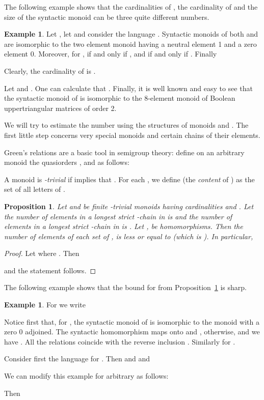 \documentclass[copyright]{eptcs}
\newcounter{theorem}
\newtheorem{proposition}[theorem]{Proposition}
\theoremstyle{definition}
\newtheorem{example}[theorem]{Example}
\begin{document}
The following example shows that the cardinalities of ,
the cardinality of  and the size of the syntactic monoid 
can be three quite different numbers.
 
\begin{example}
Let , let  and consider the language .
Syntactic monoids of both  and  are isomorphic to the
two element monoid  having a neutral element 1 and
a zero element 0. Moreover, for ,
 if and only if , and
 if and only if .
Finally 

Clearly, the cardinality of  is 
.

Let  and . 
One can calculate that .
Finally, it is well known and easy to see that
the syntactic monoid of  is isomorphic to the 8-element
monoid of Boolean uppertriangular matrices of order 2.
\end{example}

\medskip
We will try to estimate the number  using the structures
of monoids  and . The first little step concerns very
special monoids and certain chains of their elements. 

Green's relations are a basic tool in semigroup theory:
define on an arbitrary monoid  the quasiorders ,
 and  as follows:

A monoid  is {\it -trivial} if 
 implies that .
For each , we define  (the {\it content} of )
as the set of all letters
of .


\begin{proposition}\label{prop-chains}
Let  and  be finite -trivial monoids having cardinalities
 and .
Let the number of elements in
a longest strict -chain in  is  and the
number of elements in
a longest strict -chain in  is . Let ,
 be homomorphisms.
Then the number of elements of each set of ,
is less or equal to  (which is ).
In particular,

\end{proposition}

\begin{proof}
Let  where . Then


and the statement follows.
\end{proof}

The following example shows that the bound for  from
Proposition~\ref{prop-chains} is sharp.

\begin{example}
For  we write 

Notice first that, for ,
the syntactic monoid of  is isomorphic to
the monoid  with a zero 0 adjoined.  
The syntactic homomorphism  maps  onto 
and , otherwise, and we have .
All the relations  coincide with the reverse inclusion
.
Similarly for .

Consider first the language  for
.
Then  and  and


\medskip
We can modify this example for arbitrary  as follows:

Then



\end{example}
\end{document}
